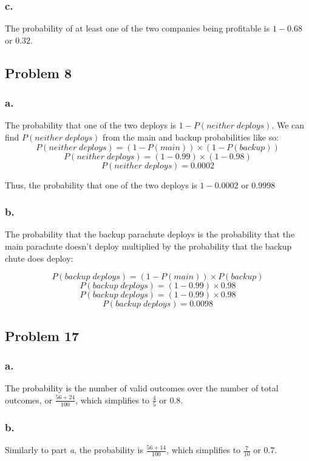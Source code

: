 \documentclass[11pt]{article}
\begin{document}
\subsubsection*{c.}
The probability of at least one of the two companies being profitable is 
$1 - 0.68$ or $0.32$. 

\subsection*{Problem 8}
\subsubsection*{a.}
The probability that one of the two deploys is $1 - P(neither\;deploys)$. We can
find $P(neither\;deploys)$ from the main and backup probabilities like so:
\[P(neither\;deploys) = (1 - P(main)) \times (1 - P(backup)) \]
\[P(neither\;deploys) = (1 - 0.99) \times (1 - 0.98) \]
\[P(neither\;deploys) = 0.0002 \]

Thus, the probability that one of the two deploys is $1 - 0.0002$ or $0.9998$

\subsubsection*{b.}
The probability that the backup parachute deploys is the probability that the
main parachute doesn't deploy multiplied by the probability that the backup
chute does deploy:

\[P(backup\;deploys) = (1 - P(main)) \times P(backup) \]
\[P(backup\;deploys) = (1 - 0.99) \times 0.98 \]
\[P(backup\;deploys) = (1 - 0.99) \times 0.98 \]
\[P(backup\;deploys) = 0.0098 \]

\subsection*{Problem 17}
\subsubsection*{a.}
The probability is the number of valid outcomes over the number of total
outcomes, or $\frac{56+24}{100}$, which simplifies to $\frac{4}{5}$ or $0.8$. 

\subsubsection*{b.}
Similarly to part \textit{a}, the probability is $\frac{56+14}{100}$, which
simplifies to $\frac{7}{10}$ or $0.7$. 
\end{document}
